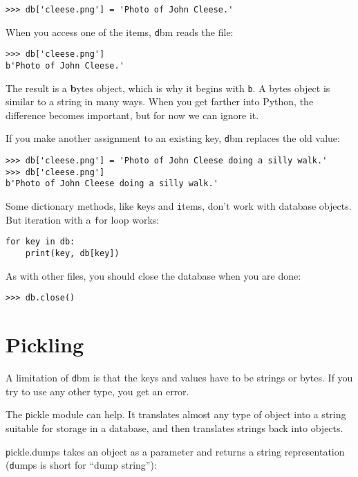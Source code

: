 \documentclass[
DIV=11,
fontsize=12,
twoside,
headinclude=false,
titlepage=firstiscover,
abstract=true,
headsepline=true,
footsepline=true,
chapterprefix=true, %
headings=big,
bibliography=totoc,%
captions=tableheading
]{scrbook}
\theoremstyle{definition}
\begin{document}
\begin{lstlisting}
>>> db['cleese.png'] = 'Photo of John Cleese.'
\end{lstlisting}
%
When you access one of the items, {\texttt dbm} reads the file:

\begin{lstlisting}
>>> db['cleese.png']
b'Photo of John Cleese.'
\end{lstlisting}
%
The result is a {\textbf bytes object}, which is why it begins with {\texttt
  b}.  A bytes object is similar to a string in many ways.  When you
get farther into Python, the difference becomes important, but for now
we can ignore it.

If you make another assignment to an existing key, {\texttt dbm} replaces
the old value:

\begin{lstlisting}
>>> db['cleese.png'] = 'Photo of John Cleese doing a silly walk.'
>>> db['cleese.png']
b'Photo of John Cleese doing a silly walk.'
\end{lstlisting}
%

Some dictionary methods, like {\texttt keys} and {\texttt items}, don't
work with database objects.  But iteration with a {\texttt for}
loop works:

\begin{lstlisting}
for key in db:
    print(key, db[key])
\end{lstlisting}
%
As with other files, you should close the database when you are
done:

\begin{lstlisting}
>>> db.close()
\end{lstlisting}
%


\section{Pickling}

A limitation of {\texttt dbm} is that the keys and values have to be
strings or bytes.  If you try to use any other type, you get an error.
 

The {\texttt pickle} module can help.  It translates
almost any type of object into a string suitable for storage in a
database, and then translates strings back into objects.

{\texttt pickle.dumps} takes an object as a parameter and returns
a string representation ({\texttt dumps} is short for ``dump string''):
\end{document}
